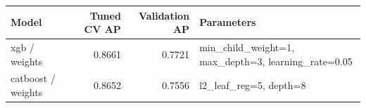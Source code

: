 \begin{tabular}{lrrp{}}
\toprule Model & Tuned CV AP & Validation AP & Parameters \\
\midrule
xgb / weights & 0.8661 & 0.7721 & min\_child\_weight=1, max\_depth=3, learning\_rate=0.05 \\
catboost / weights & 0.8652 & 0.7556 & l2\_leaf\_reg=5, depth=8 \\
\bottomrule
\end{tabular}

